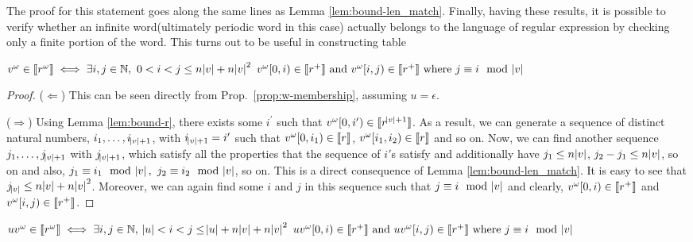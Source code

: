 The proof for this statement goes along the same lines as Lemma \ref{lem:bound-len_match}. Finally, having these results, it is possible to verify whether an infinite word(ultimately periodic word in this case) actually belongs to the language of regular expression by checking only a finite portion of the word. This turns out to be useful in constructing table

\begin{theorem}{\label{thm:bounded-w-membership}}
$v^{\omega}\in {\llbracket}r^{\omega}{\rrbracket}\iff \exists i, j\in \mathbb{N},\ 0<i<j\leq n\abs{v}+n\abs{v}^2\ v^\omega[0,i)\in {\llbracket}r^+{\rrbracket}  \text{ and } v^\omega[i,j) \in {\llbracket}r^+{\rrbracket} \text{ where } j\equiv i\mod \abs{v}$
\end{theorem}
\begin{proof}
($\Leftarrow$) This can be seen directly from Prop.~\ref{prop:w-membership}, assuming $u=\epsilon$.

($\Rightarrow$) Using Lemma \ref{lem:bound-r}, there exists some $i^{\prime}$ such that $v^\omega[0,i^{\prime})\in {\llbracket}r^{\abs{v}+1}{\rrbracket}$. As a result, we can generate a sequence of distinct natural numbers, $i_1,\ldots, i_{\abs{v}+1}$, with $i_{\abs{v}+1}=i^{\prime}$ such that $v^\omega[0,i_1)\in{\llbracket}r{\rrbracket}$, $v^\omega[i_1,i_2)\in {\llbracket}r{\rrbracket}$ and so on. Now, we can find another sequence $j_1, \ldots, j_{\abs{v}+1}$ with  $j_{\abs{v}+1}$, which satisfy all the properties that the sequence of $i'$s satisfy and additionally have $j_1\leq n\abs{v}$, $j_2-j_1\leq n\abs{v}$, so on and also, $j_1\equiv i_1 \mod {\abs{v}},$ $j_2\equiv i_2 \mod \abs{v}$, so on. This is a direct consequence of Lemma \ref{lem:bound-len_match}. It is easy to see that $j_{\abs{v}}\leq n\abs{v}+n\abs{v}^2$. Moreover, we can again find some $i$ and $j$ in this sequence such that $j\equiv i \mod \abs{v}$ and clearly, $v^\omega[0,i) \in {\llbracket}r^+{\rrbracket}$ and $v^\omega[i,j) \in {\llbracket}r^+{\rrbracket}$.
\end{proof}


\begin{theorem}
$uv^\omega\in \sema{r^\omega}\iff \exists i, j\in \mathbb{N},\ \abs{u}<i<j\leq \abs{u}+n\abs{v}+n\abs{v}^2\ uv^\omega[0,i)\in \sema{r^+}  \text{ and } uv^\omega[i,j) \in \sema{r^+} \text{ where } j\equiv i\mod \abs{v}$
\end{theorem}

